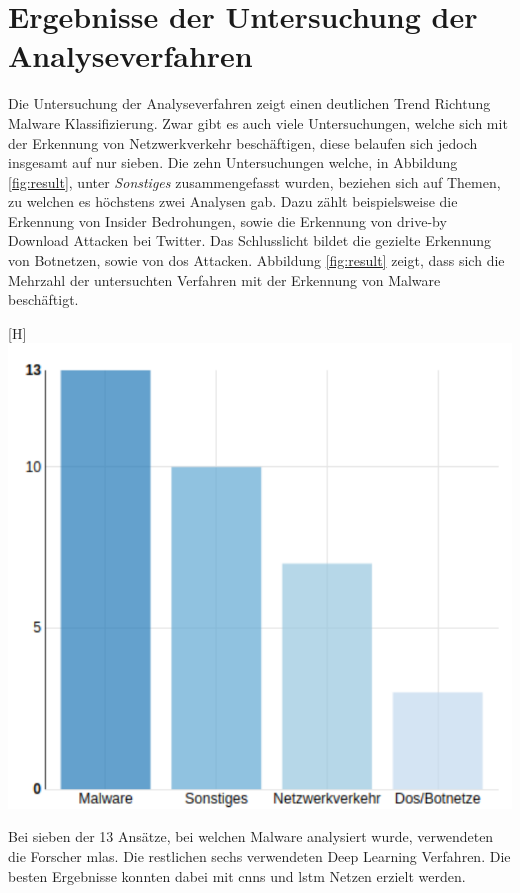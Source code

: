 \documentclass[
    12pt, %
    DIV10,
    ngerman, %
    a4paper, %
    oneside, %
    titlepage, %
    parskip=half, %
    headings=normal, %
    listof=totoc, %
    bibliography=totoc, %
    index=totoc, %
    captions=tableheading, %
    final %
]{scrreprt}
\begin{document}
\section{Ergebnisse der Untersuchung der Analyseverfahren}\label{sec:ergebnis}
Die Untersuchung der Analyseverfahren zeigt einen deutlichen Trend Richtung Malware Klassifizierung. Zwar gibt es auch viele Untersuchungen, welche sich mit der Erkennung von Netzwerkverkehr beschäftigen, diese belaufen sich jedoch insgesamt auf nur sieben. Die zehn Untersuchungen welche, in Abbildung \ref{fig:result}, unter \emph{Sonstiges} zusammengefasst wurden, beziehen sich auf Themen, zu welchen es höchstens zwei Analysen gab. Dazu zählt beispielsweise die Erkennung von Insider Bedrohungen, sowie die Erkennung von drive-by Download Attacken bei Twitter. Das Schlusslicht bildet die gezielte Erkennung von Botnetzen, sowie von \ac{dos} Attacken. Abbildung \ref{fig:result} zeigt, dass sich die Mehrzahl der untersuchten Verfahren mit der Erkennung von Malware beschäftigt.
\begin{center}[H]
\includegraphics[scale=0.7]{img/res.pdf}
\label{fig:result}
\end{center}
Bei sieben der 13 Ansätze, bei welchen Malware analysiert wurde, verwendeten die Forscher \ac{mlas}. Die restlichen sechs verwendeten Deep Learning Verfahren. Die besten Ergebnisse konnten dabei mit \ac{cnns} und \ac{lstm} Netzen erzielt werden.\\
\end{document}
